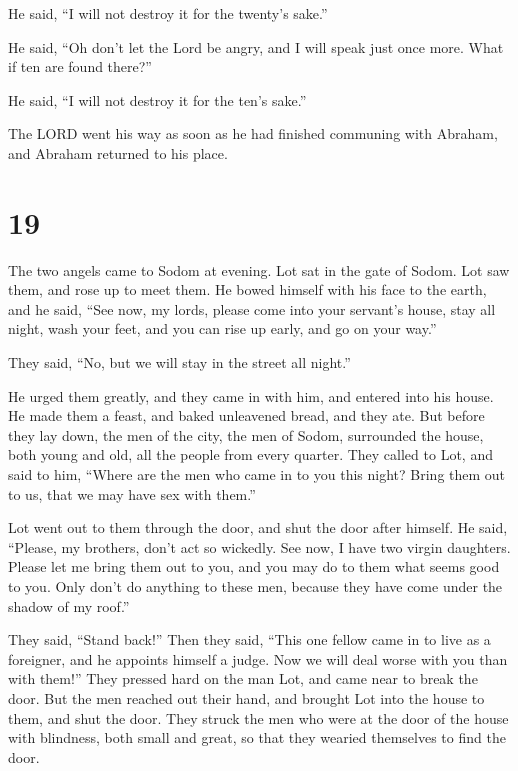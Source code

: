 He said, ``I will not destroy it for the twenty's sake.''

 He said, ``Oh don't let the Lord be angry, and I will
speak just once more. What if ten are found there?''

He said, ``I will not destroy it for the ten's sake.''

 The LORD went his way as soon as he had finished communing
with Abraham, and Abraham returned to his place.

\hypertarget{section-18}{%
\section{19}\label{section-18}}

 The two angels came to Sodom at evening. Lot sat in the
gate of Sodom. Lot saw them, and rose up to meet them. He bowed himself
with his face to the earth,  and he said, ``See now, my
lords, please come into your servant's house, stay all night, wash your
feet, and you can rise up early, and go on your way.''

They said, ``No, but we will stay in the street all night.''

 He urged them greatly, and they came in with him, and
entered into his house. He made them a feast, and baked unleavened
bread, and they ate.  But before they lay down, the men of
the city, the men of Sodom, surrounded the house, both young and old,
all the people from every quarter.  They called to Lot, and
said to him, ``Where are the men who came in to you this night? Bring
them out to us, that we may have sex with them.''

 Lot went out to them through the door, and shut the door
after himself.  He said, ``Please, my brothers, don't act so
wickedly.  See now, I have two virgin daughters. Please let
me bring them out to you, and you may do to them what seems good to you.
Only don't do anything to these men, because they have come under the
shadow of my roof.''

 They said, ``Stand back!'' Then they said, ``This one
fellow came in to live as a foreigner, and he appoints himself a judge.
Now we will deal worse with you than with them!'' They pressed hard on
the man Lot, and came near to break the door.  But the men
reached out their hand, and brought Lot into the house to them, and shut
the door.  They struck the men who were at the door of the
house with blindness, both small and great, so that they wearied
themselves to find the door.

